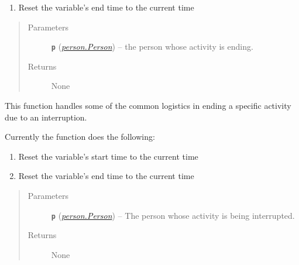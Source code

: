 \documentclass[letterpaper,10pt,english]{sphinxmanual}
\begin{document}
\begin{fulllineitems}
\begin{fulllineitems}
\begin{enumerate}
\item {} 
Reset the {\hyperref[state:state.State]{\emph{}}} variable's end time to the current time

\end{enumerate}
\begin{quote}\begin{description}
\item[{Parameters}] \leavevmode
\textbf{\texttt{p}} ({\hyperref[person:person.Person]{\emph{\emph{person.Person}}}}) -- the person whose activity is ending.

\item[{Returns}] \leavevmode
None

\end{description}\end{quote}

\end{fulllineitems}


\begin{fulllineitems}
\label{activity:activity.Activity.halt}
This function handles some of the common logistics in ending a specific activity due to an         interruption.

Currently the function does the following:
\begin{enumerate}
\item {} 
Reset the {\hyperref[state:state.State]{\emph{}}} variable's start time to the current time

\item {} 
Reset the {\hyperref[state:state.State]{\emph{}}} variable's end time to the current time

\end{enumerate}
\begin{quote}\begin{description}
\item[{Parameters}] \leavevmode
\textbf{\texttt{p}} ({\hyperref[person:person.Person]{\emph{\emph{person.Person}}}}) -- The person whose activity is being interrupted.

\item[{Returns}] \leavevmode
None

\end{description}\end{quote}

\end{fulllineitems}


\end{fulllineitems}
\end{document}

